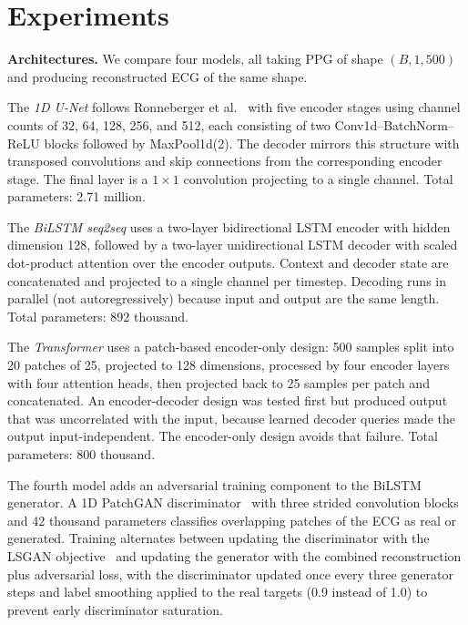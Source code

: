 \documentclass[11pt,a4paper]{article}
\begin{document}
\section{Experiments}

\textbf{Architectures.} We compare four models, all taking PPG of shape $(B, 1, 500)$ and producing reconstructed ECG of the same shape.

The \textit{1D U-Net} follows Ronneberger et al.~\cite{ronneberger2015unet} with five encoder stages using channel counts of 32, 64, 128, 256, and 512, each consisting of two Conv1d--BatchNorm--ReLU blocks followed by MaxPool1d(2). The decoder mirrors this structure with transposed convolutions and skip connections from the corresponding encoder stage. The final layer is a $1{\times}1$ convolution projecting to a single channel. Total parameters: 2.71 million.

The \textit{BiLSTM seq2seq} uses a two-layer bidirectional LSTM encoder with hidden dimension 128, followed by a two-layer unidirectional LSTM decoder with scaled dot-product attention over the encoder outputs. Context and decoder state are concatenated and projected to a single channel per timestep. Decoding runs in parallel (not autoregressively) because input and output are the same length. Total parameters: 892 thousand.

The \textit{Transformer} uses a patch-based encoder-only design: 500 samples split into 20 patches of 25, projected to 128 dimensions, processed by four encoder layers with four attention heads, then projected back to 25 samples per patch and concatenated. An encoder-decoder design was tested first but produced output that was uncorrelated with the input, because learned decoder queries made the output input-independent. The encoder-only design avoids that failure. Total parameters: 800 thousand.

The fourth model adds an adversarial training component to the BiLSTM generator. A 1D PatchGAN discriminator~\cite{isola2017pix2pix} with three strided convolution blocks and 42 thousand parameters classifies overlapping patches of the ECG as real or generated. Training alternates between updating the discriminator with the LSGAN objective~\cite{mao2017lsgan} and updating the generator with the combined reconstruction plus adversarial loss, with the discriminator updated once every three generator steps and label smoothing applied to the real targets (0.9 instead of 1.0) to prevent early discriminator saturation.
\end{document}
